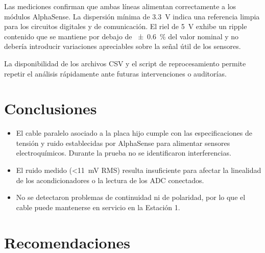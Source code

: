 \documentclass[12pt,a4paper]{article}
\begin{document}
Las mediciones confirman que ambas líneas alimentan correctamente a los módulos AlphaSense. La dispersión mínima de \SI{3.3}{\volt} indica una referencia limpia para los circuitos digitales y de comunicación. El riel de \SI{5}{\volt} exhibe un ripple contenido que se mantiene por debajo de \SI{\pm 0.6}{\percent} del valor nominal y no debería  introducir variaciones apreciables sobre la señal útil de los sensores.

La disponibilidad de los archivos CSV y el script de reprocesamiento permite repetir el análisis rápidamente ante futuras intervenciones o auditorías.

\section{Conclusiones}

\begin{itemize}
    \item El cable paralelo asociado a la placa hijo cumple con las especificaciones de tensión y ruido establecidas por AlphaSense para alimentar sensores electroquímicos. Durante la prueba no se identificaron interferencias.
    \item El ruido medido (\textless\SI{11}{\milli\volt} RMS) resulta insuficiente para afectar la linealidad de los acondicionadores o la lectura de los ADC conectados.
    \item No se detectaron problemas de continuidad ni de polaridad, por lo que el cable puede mantenerse en servicio en la Estación 1.
\end{itemize}

\section{Recomendaciones}
\end{document}
